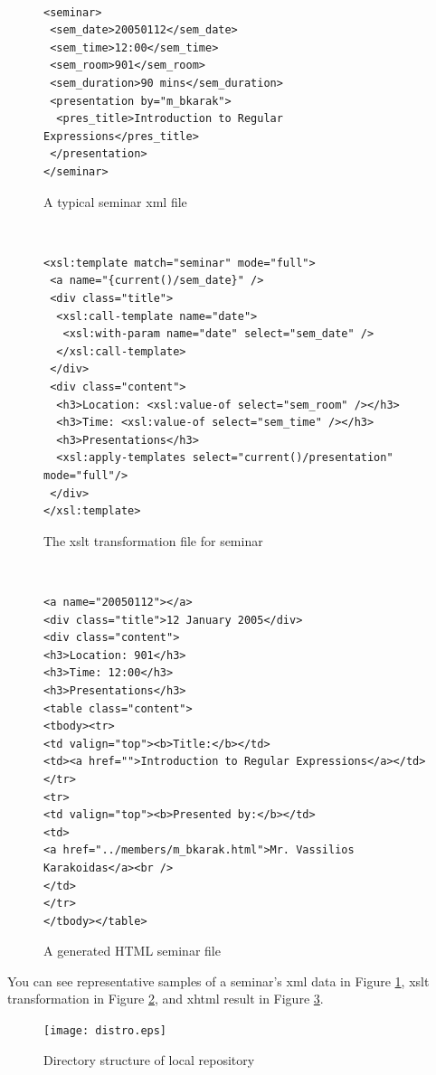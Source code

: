 \documentclass{elsart}
\begin{document}
\begin{figure}
{\small \tt%
\begin{verbatim}
<seminar>
 <sem_date>20050112</sem_date>
 <sem_time>12:00</sem_time>
 <sem_room>901</sem_room>
 <sem_duration>90 mins</sem_duration>
 <presentation by="m_bkarak">
  <pres_title>Introduction to Regular Expressions</pres_title>
 </presentation>
</seminar>
\end{verbatim}
}
\caption{A typical seminar {\sc xml} file}
\label{fig:project-xml}
\end{figure}

\begin{figure}
{\small \tt%
\begin{verbatim}
<xsl:template match="seminar" mode="full">
 <a name="{current()/sem_date}" />
 <div class="title">
  <xsl:call-template name="date">
   <xsl:with-param name="date" select="sem_date" />
  </xsl:call-template>
 </div>
 <div class="content">
  <h3>Location: <xsl:value-of select="sem_room" /></h3>
  <h3>Time: <xsl:value-of select="sem_time" /></h3>
  <h3>Presentations</h3>
  <xsl:apply-templates select="current()/presentation" mode="full"/>
 </div>
</xsl:template>
\end{verbatim}
}
\caption{The {\sc xslt} transformation file for seminar}
\label{fig:project-xslt}
\end{figure}

\begin{figure}
{\small \tt%
\begin{verbatim}
<a name="20050112"></a>
<div class="title">12 January 2005</div>
<div class="content">
<h3>Location: 901</h3>
<h3>Time: 12:00</h3>
<h3>Presentations</h3>
<table class="content">
<tbody><tr>
<td valign="top"><b>Title:</b></td>
<td><a href="">Introduction to Regular Expressions</a></td>
</tr>
<tr>
<td valign="top"><b>Presented by:</b></td>
<td>
<a href="../members/m_bkarak.html">Mr. Vassilios Karakoidas</a><br />
</td>
</tr>
</tbody></table>
\end{verbatim}
}
\caption{A generated HTML seminar file}
\label{fig:project-html}
\end{figure}

You can see representative samples of a seminar's
{\sc xml} data in Figure \ref{fig:project-xml},
{\sc xslt} transformation in Figure \ref{fig:project-xslt},
and {\sc xhtml} result in Figure \ref{fig:project-html}.

\begin{figure}
\texttt{[image: distro.eps]}
\caption{Directory structure of local repository}
\label{fig:eltrun-web-distro}
\end{figure}
\end{document}

